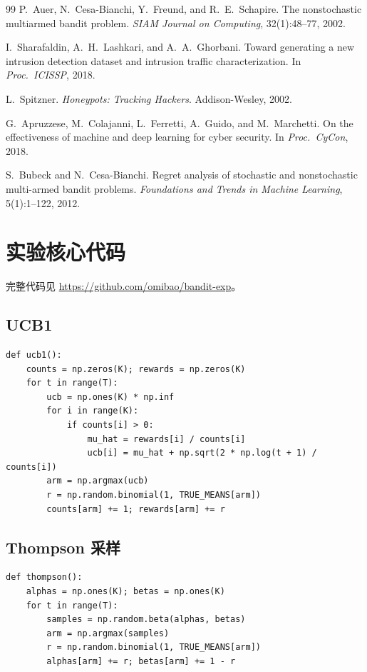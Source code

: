 \documentclass[UTF8,a4paper,11pt,zihao=5]{ctexart}
\begin{document}
\begin{thebibliography}{99}
P.~Auer, N.~Cesa-Bianchi, Y.~Freund, and R.~E.~Schapire.
The nonstochastic multiarmed bandit problem.
{\em SIAM Journal on Computing}, 32(1):48--77, 2002.

I.~Sharafaldin, A.~H.~Lashkari, and A.~A.~Ghorbani.
Toward generating a new intrusion detection dataset and intrusion traffic characterization.
In {\em Proc.\ ICISSP}, 2018.

L.~Spitzner.
{\em Honeypots: Tracking Hackers}.
Addison-Wesley, 2002.

G.~Apruzzese, M.~Colajanni, L.~Ferretti, A.~Guido, and M.~Marchetti.
On the effectiveness of machine and deep learning for cyber security.
In {\em Proc.\ CyCon}, 2018.

S.~Bubeck and N.~Cesa-Bianchi.
Regret analysis of stochastic and nonstochastic multi-armed bandit problems.
{\em Foundations and Trends in Machine Learning}, 5(1):1--122, 2012.

\end{thebibliography}

\newpage
\appendix
\section{实验核心代码}

完整代码见 \url{https://github.com/omibao/bandit-exp}。

\subsection*{UCB1}

\begin{verbatim}
def ucb1():
    counts = np.zeros(K); rewards = np.zeros(K)
    for t in range(T):
        ucb = np.ones(K) * np.inf
        for i in range(K):
            if counts[i] > 0:
                mu_hat = rewards[i] / counts[i]
                ucb[i] = mu_hat + np.sqrt(2 * np.log(t + 1) / counts[i])
        arm = np.argmax(ucb)
        r = np.random.binomial(1, TRUE_MEANS[arm])
        counts[arm] += 1; rewards[arm] += r
\end{verbatim}

\subsection*{Thompson 采样}

\begin{verbatim}
def thompson():
    alphas = np.ones(K); betas = np.ones(K)
    for t in range(T):
        samples = np.random.beta(alphas, betas)
        arm = np.argmax(samples)
        r = np.random.binomial(1, TRUE_MEANS[arm])
        alphas[arm] += r; betas[arm] += 1 - r
\end{verbatim}
\end{document}
